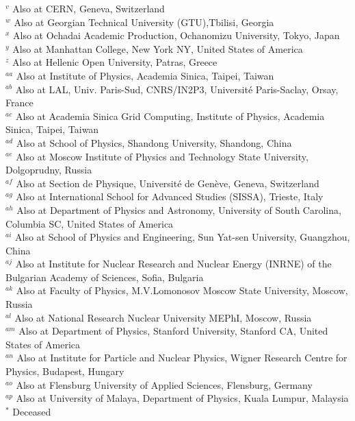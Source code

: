 \begin{flushleft}
$^{v}$ Also at CERN, Geneva, Switzerland\\
$^{w}$ Also at Georgian Technical University (GTU),Tbilisi, Georgia\\
$^{x}$ Also at Ochadai Academic Production, Ochanomizu University, Tokyo, Japan\\
$^{y}$ Also at Manhattan College, New York NY, United States of America\\
$^{z}$ Also at Hellenic Open University, Patras, Greece\\
$^{aa}$ Also at Institute of Physics, Academia Sinica, Taipei, Taiwan\\
$^{ab}$ Also at LAL, Univ. Paris-Sud, CNRS/IN2P3, Universit{\'e} Paris-Saclay, Orsay, France\\
$^{ac}$ Also at Academia Sinica Grid Computing, Institute of Physics, Academia Sinica, Taipei, Taiwan\\
$^{ad}$ Also at School of Physics, Shandong University, Shandong, China\\
$^{ae}$ Also at Moscow Institute of Physics and Technology State University, Dolgoprudny, Russia\\
$^{af}$ Also at Section de Physique, Universit{\'e} de Gen{\`e}ve, Geneva, Switzerland\\
$^{ag}$ Also at International School for Advanced Studies (SISSA), Trieste, Italy\\
$^{ah}$ Also at Department of Physics and Astronomy, University of South Carolina, Columbia SC, United States of America\\
$^{ai}$ Also at School of Physics and Engineering, Sun Yat-sen University, Guangzhou, China\\
$^{aj}$ Also at Institute for Nuclear Research and Nuclear Energy (INRNE) of the Bulgarian Academy of Sciences, Sofia, Bulgaria\\
$^{ak}$ Also at Faculty of Physics, M.V.Lomonosov Moscow State University, Moscow, Russia\\
$^{al}$ Also at National Research Nuclear University MEPhI, Moscow, Russia\\
$^{am}$ Also at Department of Physics, Stanford University, Stanford CA, United States of America\\
$^{an}$ Also at Institute for Particle and Nuclear Physics, Wigner Research Centre for Physics, Budapest, Hungary\\
$^{ao}$ Also at Flensburg University of Applied Sciences, Flensburg, Germany\\
$^{ap}$ Also at University of Malaya, Department of Physics, Kuala Lumpur, Malaysia\\
$^{*}$ Deceased
\end{flushleft}
